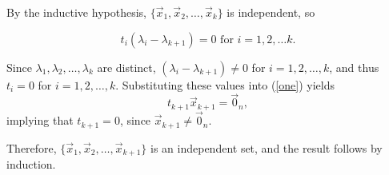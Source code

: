 \documentclass[pdf,9pt]{beamer}
\begin{document}
\begin{frame}[fragile]
    \begin{proofnoend}[continued]
    By the inductive hypothesis,
    $\{ \vec{x}_1, \vec{x}_2, \ldots, \vec{x}_k\}$ is independent,
    so

    \[ t_i(\lambda_i-\lambda_{k+1})=0 \mbox{ for } i=1, 2, \ldots k.\]

    Since $\lambda_1, \lambda_2, \ldots, \lambda_k$ are distinct,
    $(\lambda_i-\lambda_{k+1})\neq 0$ for $i=1, 2,\ldots,k$,
    and thus
    $t_i=0$ for $i=1, 2, \ldots, k$.
    Substituting these values into (\ref{one}) yields
    \[ t_{k+1}\vec{x}_{k+1}=\vec{0}_n,\]
    implying that $t_{k+1}=0$, since $\vec{x}_{k+1}\neq \vec{0}_n$.
    \smallskip

    Therefore, $\{ \vec{x}_1, \vec{x}_2, \ldots, \vec{x}_{k+1} \}$ is an independent
    set, and the result follows by induction.
\myQED\end{proofnoend}
\end{frame}
\end{document}
